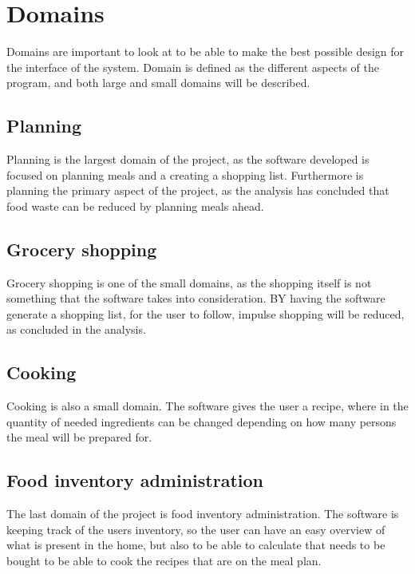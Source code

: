 \section{Domains}
Domains are important to look at to be able to make the best possible design for the interface of the system. Domain is defined as the different aspects of the program, and both large and small domains will be described.

\subsection{Planning}
Planning is the largest domain of the project, as the software developed is focused on planning meals and a creating a shopping list. Furthermore is planning the primary aspect of the project, as the analysis has concluded that food waste can be reduced by planning meals ahead.

\subsection{Grocery shopping}
Grocery shopping is one of the small domains, as the shopping itself is not something that the software takes into consideration. BY having the software generate a shopping list, for the user to follow, impulse shopping will be reduced, as concluded in the analysis.

\subsection{Cooking}
Cooking is also a small domain. The software gives the user a recipe, where in the quantity of needed ingredients can be changed depending on how many persons the meal will be prepared for.

\subsection{Food inventory administration}
The last domain of the project is food inventory administration. The software is keeping track of the users inventory, so the user can have an easy overview of what is present in the home, but also to be able to calculate that needs to be bought to be able to cook the recipes that are on the meal plan.
